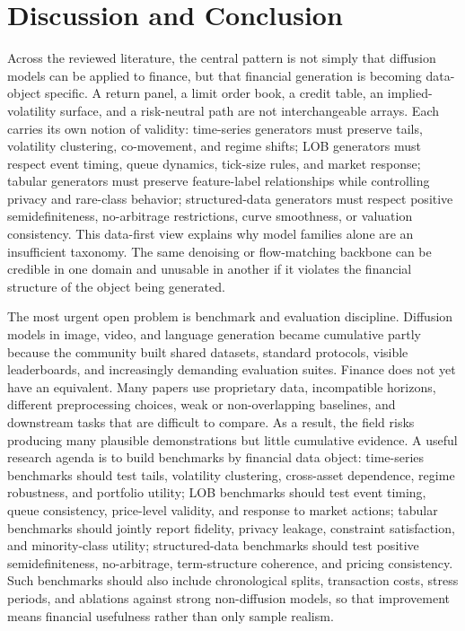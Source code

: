 \documentclass[sigconf,nonacm]{acmart}
\begin{document}
\section{Discussion and Conclusion}\label{sec:discussion}

Across the reviewed literature, the central pattern is not simply that diffusion
models can be applied to finance, but that financial generation is becoming
data-object specific. A return panel, a limit order book, a credit table, an
implied-volatility surface, and a risk-neutral path are not interchangeable
arrays. Each carries its own notion of validity: time-series generators must
preserve tails, volatility clustering, co-movement, and regime shifts; LOB
generators must respect event timing, queue dynamics, tick-size rules, and market
response; tabular generators must preserve feature-label relationships while
controlling privacy and rare-class behavior; structured-data generators must
respect positive semidefiniteness, no-arbitrage restrictions, curve smoothness,
or valuation consistency. This data-first view explains why model families alone
are an insufficient taxonomy. The same denoising or flow-matching backbone can be
credible in one domain and unusable in another if it violates the financial
structure of the object being generated.

The most urgent open problem is benchmark and evaluation discipline. Diffusion
models in image, video, and language generation became cumulative partly because
the community built shared datasets, standard protocols, visible leaderboards,
and increasingly demanding evaluation suites. Finance does not yet have an
equivalent. Many papers use proprietary data, incompatible horizons, different
preprocessing choices, weak or non-overlapping baselines, and downstream tasks
that are difficult to compare. As a result, the field risks producing many
plausible demonstrations but little cumulative evidence. A useful research agenda
is to build benchmarks by financial data object: time-series benchmarks should
test tails, volatility clustering, cross-asset dependence, regime robustness, and
portfolio utility; LOB benchmarks should test event timing, queue consistency,
price-level validity, and response to market actions; tabular benchmarks should
jointly report fidelity, privacy leakage, constraint satisfaction, and
minority-class utility; structured-data benchmarks should test positive
semidefiniteness, no-arbitrage, term-structure coherence, and pricing
consistency. Such benchmarks should also include chronological splits,
transaction costs, stress periods, and ablations against strong non-diffusion
models, so that improvement means financial usefulness rather than only sample
realism.
\end{document}

